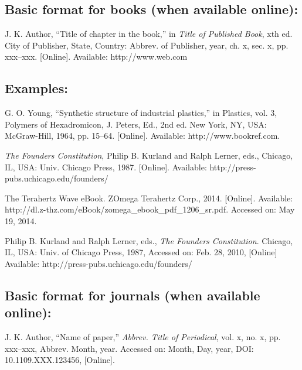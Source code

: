\documentclass[journal]{IEEEtai}
\begin{document}
\subsection*{Basic format for books (when available online):}\vspace*{-12pt}
\begin{thebibliography}{34}
\item[]
J. K. Author, ``Title of chapter in the book,'' in {\em Title of Published Book}, xth ed. City of Publisher, State, Country: Abbrev. of Publisher, year, ch. x, sec. x, pp. xxx--xxx. [Online]. Available: http://www.web.com 
\end{thebibliography}


\subsection*{Examples:}\vspace*{-12pt}

\begin{thebibliography}{34}
\setcounter{enumiv}{9}

\bibitem{}G. O. Young, ``Synthetic structure of industrial plastics,'' in Plastics, vol. 3, Polymers of Hexadromicon, J. Peters, Ed., 2nd ed. New York, NY, USA: McGraw-Hill, 1964, pp. 15--64. [Online]. Available: http://www.bookref.com. 

\bibitem{} {\em The Founders Constitution}, Philip B. Kurland and Ralph Lerner, eds., Chicago, IL, USA: Univ. Chicago Press, 1987. [Online]. Available: http://press-pubs.uchicago.edu/founders/

\bibitem{} The Terahertz Wave eBook. ZOmega Terahertz Corp., 2014. [Online]. Available: http://dl.z-thz.com/eBook/zomega\_ebook\_pdf\_1206\_sr.pdf. Accessed on: May 19, 2014. 

\bibitem{} Philip B. Kurland and Ralph Lerner, eds., {\em The Founders Constitution}. Chicago, IL, USA: Univ. of Chicago Press, 1987, Accessed on: Feb. 28, 2010, [Online] Available: http://press-pubs.uchicago.edu/founders/ 
\end{thebibliography}

\subsection*{Basic format for journals (when available online):}\vspace*{-12pt}
\begin{thebibliography}{34}
\item[] J. K. Author, ``Name of paper,'' {\em Abbrev. Title of Periodical}, vol. x, no. x, pp. xxx--xxx, Abbrev. Month, year. Accessed on: Month, Day, year, DOI: 10.1109.XXX.123456, [Online].
\end{thebibliography}
\end{document}
